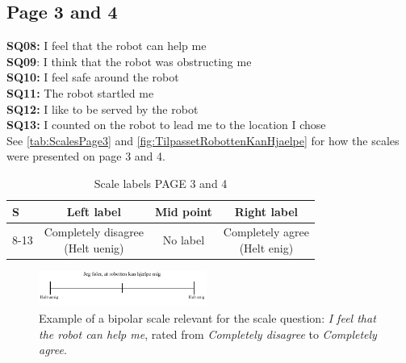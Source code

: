 \subsection{Page 3 and 4}
\noindent
\textbf{SQ08:} I feel that the robot can help me\\%
\textbf{SQ09}: I think that the robot was obstructing me\\%
\textbf{SQ10:} I feel safe around the robot\\%
\textbf{SQ11:} The robot startled me\\ %
\textbf{SQ12:} I like to be served by the robot\\%
\textbf{SQ13:} I counted on the robot to lead me to the location I chose\\%
See \autoref{tab:ScalesPage3} and  \autoref{fig:TilpassetRobottenKanHjaelpe} for how the scales were presented on page 3 and 4.
\begin{table}[H]
	\centering
\caption{Scale labels PAGE 3 and 4}
	\label{tab:ScalesPage3} 
	\begin{tabular}{l|c|c|c}
		S     & Left label & Mid point & Right label \\\hline
		8-13   & \makecell{Completely disagree\\(Helt uenig)}  & No label & \makecell{Completely agree\\(Helt enig)}                      
	\end{tabular}        
\end{table}
\noindent
%
\begin{figure}[H]
\centering
\includegraphics[width = 0.49\textwidth]{Figure/TilpassetRobottenKanHjaelpe}
\setlength{} 
\caption{Example of a bipolar scale relevant for the scale question: \textit{I feel that the robot can help me}, rated from \textit{Completely disagree} to \textit{Completely agree}.}
\label{fig:TilpassetRobottenKanHjaelpe}
\end{figure}
\noindent
% 
